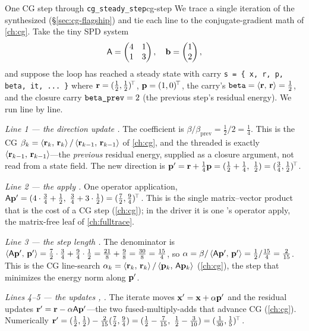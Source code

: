 \begin{workedexample}{One CG step through \texttt{cg\_steady\_step}}{cg-step}
We trace a single iteration of the synthesized 
(\S\ref{sec:cg-flagship}) and tie each line to the conjugate-gradient math of
\cref{ch:cg}. Take the tiny SPD system
\[
  \mathsf{A}=\begin{pmatrix}4&1\\1&3\end{pmatrix},\quad \mathbf{b}=\begin{pmatrix}1\\2\end{pmatrix},
\]
and suppose the loop has reached a steady state with carry
\lstinline[style=l4style]|s = { x, r, p, beta, it, ... }| where
$\mathbf{r}=(\tfrac{1}{2},\tfrac{1}{2})^{\!\top}$, $\mathbf{p}=(1,0)^{\!\top}$, the carry's
$\texttt{beta}=\left\langle \mathbf{r},\, \mathbf{r}\right\rangle=\tfrac12$, and the closure carry
$\texttt{beta\_prev}=2$ (the previous step's residual energy). We run
 line by line.

\medskip
\emph{Line 1 --- the direction update .}
The coefficient is $\beta/\beta_{\text{prev}}=\tfrac12/2=\tfrac14$. This is the CG
$\beta_k=\left\langle \mathbf{r}_k,\, \mathbf{r}_k\right\rangle/\left\langle \mathbf{r}_{k-1},\, \mathbf{r}_{k-1}\right\rangle$ of \cref{ch:cg}, and the
threaded  is exactly $\left\langle \mathbf{r}_{k-1},\, \mathbf{r}_{k-1}\right\rangle$---the
\emph{previous} residual energy, supplied as a closure argument, not read from a state
field. The new direction is
$\vp'=\vr+\tfrac14\vp=(\tfrac12+\tfrac14,\ \tfrac12)=(\tfrac34,\tfrac12)^{\!\top}$.

\emph{Line 2 --- the apply .} One operator application,
$\mat{A}\vp'=(4\cdot\tfrac34+\tfrac12,\ \tfrac34+3\cdot\tfrac12)=(\tfrac72,\tfrac94)^{\!\top}$.
This is the single matrix--vector product that is the cost of a CG step (\cref{ch:cg});
in the driver it is one 's operator apply, the matrix-free leaf of
\cref{ch:fulltrace}.

\emph{Line 3 --- the step length .} The denominator
is $\left\langle \mathsf{A}\mathbf{p}',\, \mathbf{p}'\right\rangle=\tfrac72\cdot\tfrac34+\tfrac94\cdot\tfrac12=\tfrac{21}{8}+\tfrac98=\tfrac{30}{8}=\tfrac{15}{4}$,
so $\alpha=\beta/\left\langle \mathsf{A}\mathbf{p}',\, \mathbf{p}'\right\rangle=\tfrac12/\tfrac{15}{4}=\tfrac{2}{15}$.
This is the CG line-search $\alpha_k=\left\langle \mathbf{r}_k,\, \mathbf{r}_k\right\rangle/\left\langle \mathbf{p}_k,\, \mathsf{A}\mathbf{p}_k\right\rangle$
(\cref{ch:cg}), the step that minimizes the energy norm along $\mathbf{p}'$.

\emph{Lines 4--5 --- the updates ,
.} The iterate moves $\mathbf{x}'=\mathbf{x}+\alpha\mathbf{p}'$ and the
residual updates $\mathbf{r}'=\mathbf{r}-\alpha\mathsf{A}\mathbf{p}'$---the two  fused-multiply-adds
that advance CG (\cref{ch:cg}). Numerically
$\vr'=(\tfrac12,\tfrac12)-\tfrac{2}{15}(\tfrac72,\tfrac94)=(\tfrac12-\tfrac{7}{15},\ \tfrac12-\tfrac{3}{10})=(\tfrac{1}{30},\tfrac{1}{5})^{\!\top}$.


\end{workedexample}
